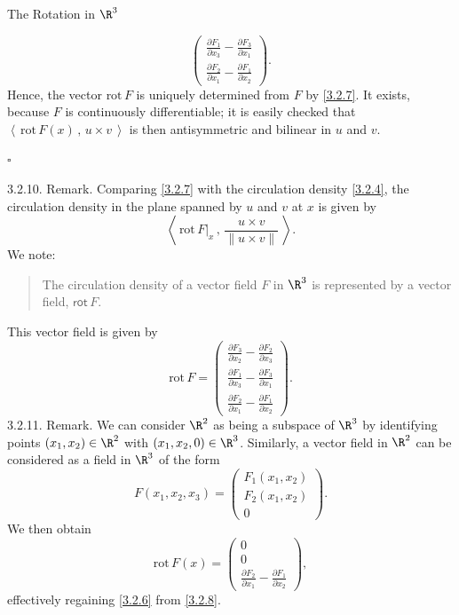 \documentclass[smaller,hyperref={CJKbookmarks=true}]{beamer}
\newcommand{\scp}[2]{\left\langle\,#1\,,\,#2\,\right\rangle} \newcommand{\scpp}{\langle\,\cdot\,,\,\cdot\,\rangle}
\begin{document}
\begin{frame}{The Rotation in $\R^3$}
\begin{spacing}{1.1}
\[\begin{pmatrix}
                     \frac{\partial F_1}{\partial x_3}-\frac{\partial F_3}{\partial x_1}  \\[4pt]
                     \frac{\partial F_2}{\partial x_1}-\frac{\partial F_1}{\partial x_2}
                   \end{pmatrix}.\]
Hence, the vector $\text{rot}\,F$ is uniquely determined from $F$ by \eqref{3.2.7}. It exists, because $F$ is continuously dif{}ferentiable; it is easily checked that $\scp{\text{rot}\,F(x)}{u\times v}$ is then antisymmetric and bilinear in $u$ and $v$.
\begin{flushright}
  $\square$
\end{flushright}
\newpage
\alert{3.2.10. Remark.} Comparing \eqref{3.2.7} with the circulation density \eqref{3.2.4}, the circulation density in the plane spanned by $u$ and $v$ at $x$ is given by
\[\scp{\text{rot}\,F|_x}{\frac{u\times v}{\|u\times v\|}}.\]
We note:
\begin{quote}
  The circulation density of a vector field $F$ in $\R^3$ is represented by a vector field, $\mathsf{rot}\,F$.
\end{quote}
This vector field is given by
\begin{equation}\label{3.2.8}
  \text{rot}\,F=\begin{pmatrix}
                     \frac{\partial F_3}{\partial x_2}-\frac{\partial F_2}{\partial x_3} \\[4pt]
                     \frac{\partial F_1}{\partial x_3}-\frac{\partial F_3}{\partial x_1}  \\[4pt]
                     \frac{\partial F_2}{\partial x_1}-\frac{\partial F_1}{\partial x_2}
                   \end{pmatrix}.
\end{equation}
\newpage
\alert{3.2.11. Remark.} We can consider $\R^2$ as being a subspace of $\R^3$ by identifying points $(x_1,x_2)\in\R^2$ with $(x_1,x_2,0)\in\R^3$. Similarly, a vector field in $\R^2$ can be considered as a field in $\R^3$ of the form
\[F(x_1,x_2,x_3)=\begin{pmatrix}
                   F_1(x_1,x_2) \\
                   F_2(x_1,x_2) \\
                   0
                 \end{pmatrix}.\]
We then obtain
\[\text{rot}\,F(x)=\begin{pmatrix}
                     0 \\
                     0 \\
                     \frac{\partial F_2}{\partial x_1}-\frac{\partial F_1}{\partial x_2}
                   \end{pmatrix},\]
ef{}fectively regaining \eqref{3.2.6} from \eqref{3.2.8}.
\end{spacing}
\end{frame}
\end{document}
